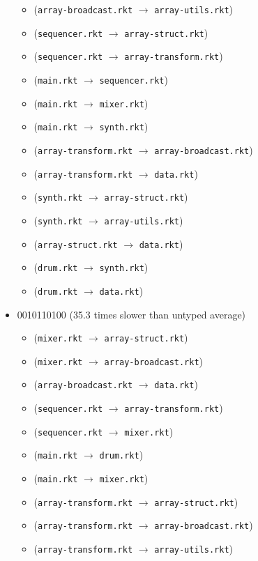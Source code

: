 \documentclass{article}
\newcommand{\mono}[1]{\texttt{#1}}
\begin{document}
\begin{itemize}
\begin{itemize}
  \item (\mono{array-broadcast.rkt} $\rightarrow$ \mono{array-utils.rkt})
  \item (\mono{sequencer.rkt} $\rightarrow$ \mono{array-struct.rkt})
  \item (\mono{sequencer.rkt} $\rightarrow$ \mono{array-transform.rkt})
  \item (\mono{main.rkt} $\rightarrow$ \mono{sequencer.rkt})
  \item (\mono{main.rkt} $\rightarrow$ \mono{mixer.rkt})
  \item (\mono{main.rkt} $\rightarrow$ \mono{synth.rkt})
  \item (\mono{array-transform.rkt} $\rightarrow$ \mono{array-broadcast.rkt})
  \item (\mono{array-transform.rkt} $\rightarrow$ \mono{data.rkt})
  \item (\mono{synth.rkt} $\rightarrow$ \mono{array-struct.rkt})
  \item (\mono{synth.rkt} $\rightarrow$ \mono{array-utils.rkt})
  \item (\mono{array-struct.rkt} $\rightarrow$ \mono{data.rkt})
  \item (\mono{drum.rkt} $\rightarrow$ \mono{synth.rkt})
  \item (\mono{drum.rkt} $\rightarrow$ \mono{data.rkt})
  \end{itemize}
\item 0010110100 (35.3 times slower than untyped average)
  \begin{itemize}
  \item (\mono{mixer.rkt} $\rightarrow$ \mono{array-struct.rkt})
  \item (\mono{mixer.rkt} $\rightarrow$ \mono{array-broadcast.rkt})
  \item (\mono{array-broadcast.rkt} $\rightarrow$ \mono{data.rkt})
  \item (\mono{sequencer.rkt} $\rightarrow$ \mono{array-transform.rkt})
  \item (\mono{sequencer.rkt} $\rightarrow$ \mono{mixer.rkt})
  \item (\mono{main.rkt} $\rightarrow$ \mono{drum.rkt})
  \item (\mono{main.rkt} $\rightarrow$ \mono{mixer.rkt})
  \item (\mono{array-transform.rkt} $\rightarrow$ \mono{array-struct.rkt})
  \item (\mono{array-transform.rkt} $\rightarrow$ \mono{array-broadcast.rkt})
  \item (\mono{array-transform.rkt} $\rightarrow$ \mono{array-utils.rkt})

\end{itemize}
\end{itemize}
\end{document}
